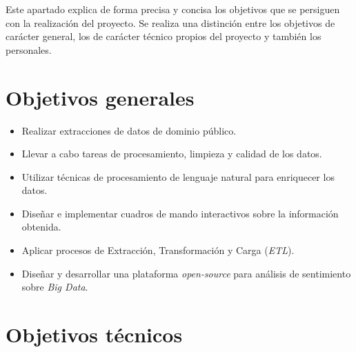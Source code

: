 
Este apartado explica de forma precisa y concisa los objetivos que se persiguen con la realización del proyecto. Se realiza una distinción entre los objetivos de carácter general, los de carácter técnico propios del proyecto y también los personales.

\section{Objetivos generales}

\begin{itemize}
    \item Realizar extracciones de datos de dominio público.

    \item Llevar a cabo tareas de procesamiento, limpieza y calidad de los datos.

    \item Utilizar técnicas de procesamiento de lenguaje natural para enriquecer los datos.

    \item Diseñar e implementar cuadros de mando interactivos sobre la información obtenida.

    \item Aplicar procesos de Extracción, Transformación y Carga (\textit{ETL}).

    \item Diseñar y desarrollar una plataforma \textit{open-source} para análisis de sentimiento sobre \textit{Big Data}.
\end{itemize}

\section{Objetivos técnicos}


